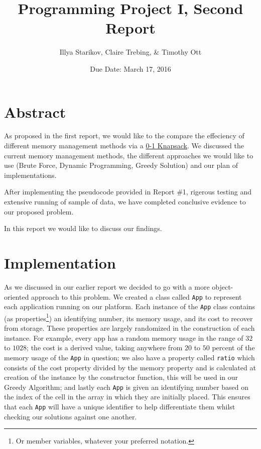 \documentclass{article}
\title{Programming Project I, Second Report}
\author{Illya Starikov, Claire Trebing, \& Timothy Ott}
\date{Due Date: March 17, 2016}
\newcommand{\ignore}[1]{}
\begin{document}
\maketitle

\section{Abstract}
As proposed in the first report, we would like to the compare the effeciency of different memory management methods via a \href{https://en.wikipedia.org/wiki/Knapsack_problem#0.2F1_knapsack_problem}{0-1 Knapsack}. We discussed the current memory management methods, the different approaches we would like to use (Brute Force, Dynamic Programming, Greedy Solution) and our plan of implementations.

After implementing the pseudocode provided in Report \#1, rigerous testing and extensive running of sample of data, we have completed conclusive evidence to our proposed problem.

In this report we would like to discuss our findings.

\section{Implementation}
As we discussed in our earlier report we decided to go with a more object-oriented approach to this problem. We created a class called \texttt{App} to represent each application running on our platform. Each instance of the \texttt{App} class contains (as properties\footnote{Or member variables, whatever your preferred notation.}) an identifying number, its memory usage, and its cost to recover from storage. These properties are largely randomized in the construction of each instance. For example, every app has a random memory usage in the range of $32$ to $1028$; the cost is a derived value, taking anywhere from $20$ to $50$ percent of the memory usage of the \texttt{App} in question; we also have a property called \texttt{ratio} which consists of the cost property divided by the memory property and is calculated at creation of the instance by the constructor function, this will be used in our Greedy Algorithm; and lastly each \texttt{App} is given an identifying number based on the index of the cell in the array in which they are initially placed. This ensures that each \texttt{App} will have a unique identifier to help differentiate them whilst\ignore{Sorry, couldn't resist swapping out while for whilst!} checking our solutions against one another.
\end{document}
